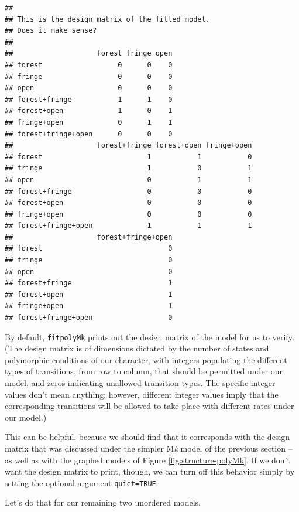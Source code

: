 \documentclass[fleqn,10pt,lineno]{wlpeerj} %
\begin{document}
\begin{verbatim}
## 
## This is the design matrix of the fitted model.
## Does it make sense?
## 
##                    forest fringe open
## forest                  0      0    0
## fringe                  0      0    0
## open                    0      0    0 
## forest+fringe           1      1    0
## forest+open             1      0    1
## fringe+open             0      1    1
## forest+fringe+open      0      0    0
##                    forest+fringe forest+open fringe+open
## forest                         1           1           0
## fringe                         1           0           1
## open                           0           1           1
## forest+fringe                  0           0           0
## forest+open                    0           0           0
## fringe+open                    0           0           0
## forest+fringe+open             1           1           1
##                    forest+fringe+open
## forest                              0
## fringe                              0
## open                                0
## forest+fringe                       1
## forest+open                         1
## fringe+open                         1
## forest+fringe+open                  0
\end{verbatim}

By default, \texttt{fitpolyMk} prints out the design matrix of the model for us to verify. (The design matrix is of dimensions dictated by the number of states and polymorphic conditions of our character, with integers populating the different types of transitions, from row to column, that should be permitted under our model, and zeros indicating unallowed transition types. The specific integer values don't mean anything; however, different integer values imply that the corresponding transitions will be allowed to take place with different rates under our model.)

This can be helpful, because we should find that it corresponds with the design matrix that was discussed under the simpler M\emph{k} model of the previous section -- as well as with the graphed models of Figure \ref{fig:structure-polyMk}. If we don't want the design matrix to print, though, we can turn off this behavior simply by setting the optional argument \texttt{quiet=TRUE}.

Let's do that for our remaining two unordered models.
\end{document}
